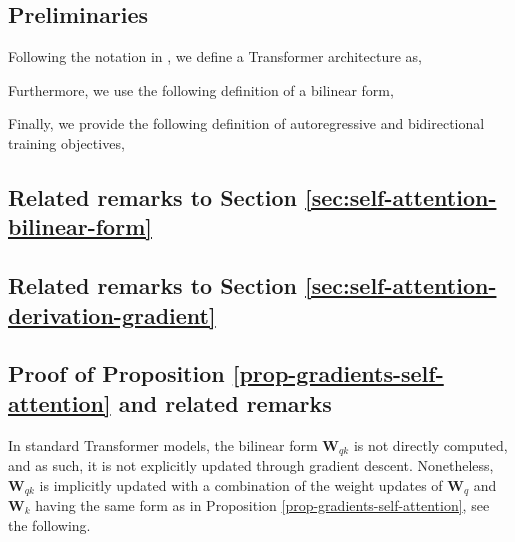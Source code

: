 
\subsection{Preliminaries}
%
Following the notation in \citep{vaswaniAttentionAllYou2017, radfordImprovingLanguageUnderstanding2018}, we define a Transformer architecture as,
%

%
Furthermore, we use the following definition of a bilinear form,

%
Finally, we provide the following definition of autoregressive and bidirectional training objectives,
%






\subsection{Related remarks to Section \ref{sec:self-attention-bilinear-form}}
\label{supp-math-self-attention-bilinear-form}
%






\subsection{Related remarks to Section \ref{sec:self-attention-derivation-gradient}}
\label{supp-math-self-attention-derivation-gradients}
%





\subsection{Proof of Proposition \ref{prop-gradients-self-attention} and related remarks}
\label{supp-math-gradients-self-attention}
%

%
In standard Transformer models, the bilinear form $\bm{W}_{qk}$ is not directly computed, and as such, it is not explicitly updated through gradient descent.
%
Nonetheless, $\bm{W}_{qk}$ is implicitly updated with a combination of the weight updates of $\bm{W}_q$ and $\bm{W}_k$ having the same form as in Proposition \ref{prop-gradients-self-attention}, see the following.
%




